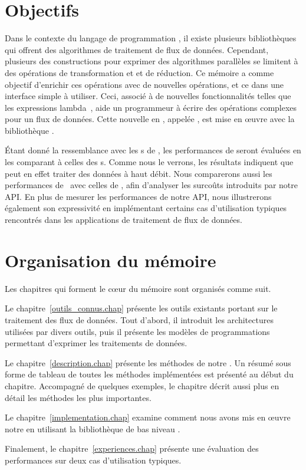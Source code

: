 \begin{introduction}
\section*{Objectifs}


Dans le contexte du langage de programmation , il existe plusieurs biblioth\`eques qui offrent des algorithmes de traitement de flux de donn\'ees. Cependant, plusieurs des constructions pour exprimer des algorithmes parall\`eles se limitent \`a des op\'erations de transformation et et de r\'eduction. Ce m\'emoire a comme objectif d'enrichir ces op\'erations avec de nouvelles op\'erations, et ce dans une interface simple \`a utiliser. Ceci, associ\'e \`a de nouvelles fonctionnalit\'es telles que les expressions lambda~\citep{josuttis2012c++}, aide un programmeur \`a \'ecrire des op\'erations complexes pour un flux de donn\'ees. Cette nouvelle  en , appel\'ee ,  est mise en \oe{}uvre avec la biblioth\`eque .


\'Etant donn\'e la ressemblance avec les s de ,
les performances de  seront \'evalu\'ees en les comparant \`a celles des s. Comme nous le verrons, les r\'esultats indiquent que  peut en effet traiter des donn\'ees \`a haut d\'ebit.
%
Nous comparerons aussi les performances de \ppff\ avec celles de
, afin d'analyser les surco\^uts introduits par notre API.
%
En plus de mesurer les performances de notre API, nous illustrerons \'egalement son expressivit\'e en impl\'ementant certains cas d'utilisation typiques rencontr\'es dans les applications de traitement de flux de donn\'ees.


\section*{Organisation du m\'emoire}

Les chapitres qui forment le c\oe{}ur du m\'emoire sont organis\'es
comme suit.


Le chapitre~\ref{outils_connus.chap}  pr\'esente les outils existants portant sur le traitement des flux de donn\'ees.  Tout d'abord, il introduit les architectures utilis\'ees par divers outils, puis il pr\'esente les mod\`eles de programmations permettant d'exprimer les traitements de donn\'ees.

Le chapitre~\ref{description.chap}  pr\'esente les m\'ethodes de notre . Un r\'esum\'e sous forme de tableau de toutes les m\'ethodes implément\'ees est pr\'esent\'e au d\'ebut du chapitre. Accompagn\'e de quelques exemples, le chapitre d\'ecrit aussi plus en d\'etail les m\'ethodes les plus importantes.

Le chapitre~\ref{implementation.chap}  examine comment nous avons mis en œuvre notre  en utilisant la biblioth\`eque de bas niveau .

Finalement, le chapitre~\ref{experiences.chap}  pr\'esente une \'evaluation des performances sur deux cas d'utilisation typiques.

\end{introduction}

